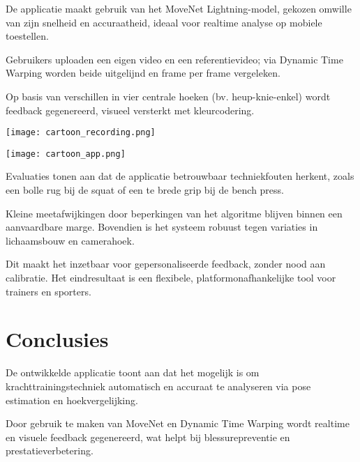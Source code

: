 \documentclass[a0,portrait]{hogent-poster}
\begin{document}
\begin{multicols}{2}
\begin{minipage}[t]{0.48\linewidth}
 De applicatie maakt gebruik van het MoveNet Lightning-model, gekozen omwille van zijn snelheid en accuraatheid, ideaal voor realtime analyse op mobiele toestellen. 

 Gebruikers uploaden een eigen video en een referentievideo; via Dynamic Time Warping worden beide uitgelijnd en frame per frame vergeleken. 

 Op basis van verschillen in vier centrale hoeken (bv. heup-knie-enkel) wordt feedback gegenereerd, visueel versterkt met kleurcodering. 

 \end{minipage}
\hfill
\begin{minipage}[t]{0.48\linewidth}
\texttt{[image: cartoon\_recording.png]}
\end{minipage}
\vspace{1em}


\noindent
\begin{minipage}[t]{0.48\linewidth}
\texttt{[image: cartoon\_app.png]}
\end{minipage}
\hfill
\begin{minipage}[t]{0.48\linewidth}


 Evaluaties tonen aan dat de applicatie betrouwbaar techniekfouten herkent, zoals een bolle rug bij de squat of een te brede grip bij de bench press. 

 Kleine meetafwijkingen door beperkingen van het algoritme blijven binnen een aanvaardbare marge. Bovendien is het systeem robuust tegen variaties in lichaamsbouw en camerahoek.

 Dit maakt het inzetbaar voor gepersonaliseerde feedback, zonder nood aan calibratie. Het eindresultaat is een flexibele, platformonafhankelijke tool voor trainers en sporters.

 \end{minipage}
\vspace{1em}

\section{Conclusies}

\noindent
\begin{minipage}[t]{0.48\linewidth}
 
De ontwikkelde applicatie toont aan dat het mogelijk is om krachttrainingstechniek automatisch en accuraat te analyseren via pose estimation en hoekvergelijking. 

Door gebruik te maken van MoveNet en Dynamic Time Warping wordt realtime en visuele feedback gegenereerd, wat helpt bij blessurepreventie en prestatieverbetering. 


\end{minipage}
\end{multicols}
\end{document}
